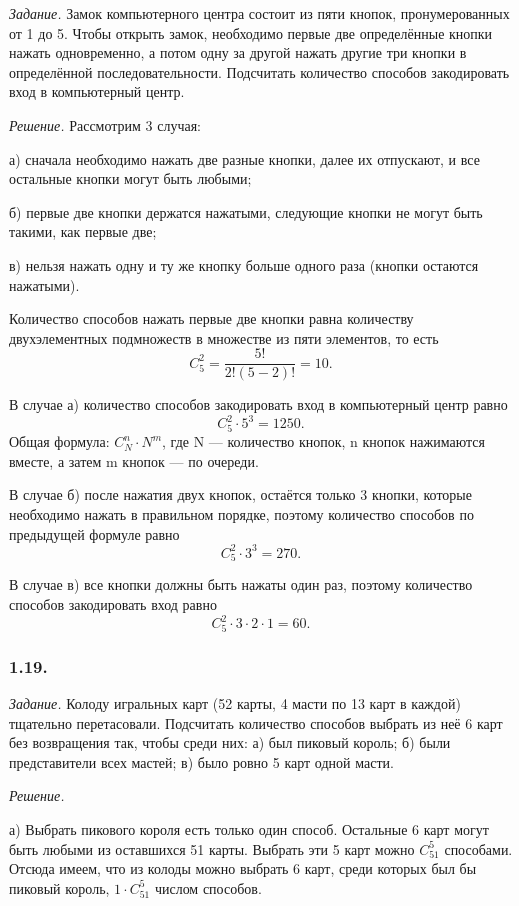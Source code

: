\documentclass{book}
\begin{document}
\textit{Задание.} Замок компьютерного центра состоит из пяти кнопок, пронумерованных от 1 до 5. Чтобы открыть замок, необходимо первые две определённые кнопки нажать одновременно, а потом одну за другой нажать другие три кнопки в определённой последовательности. Подсчитать количество способов закодировать вход в компьютерный центр.

\textit{Решение.} Рассмотрим 3 случая: 

а) сначала необходимо нажать две разные кнопки, далее их отпускают, и все остальные кнопки могут быть любыми; 

б) первые две кнопки держатся нажатыми, следующие кнопки не могут быть такими, как первые две; 

в) нельзя нажать одну и ту же кнопку больше одного раза (кнопки остаются нажатыми).

Количество способов нажать первые две кнопки равна количеству двухэлементных подмножеств в множестве из пяти элементов, то есть $$C_5^2=\frac{5!}{2!\left(5-2\right)!}=10.$$

В случае а) количество способов закодировать вход в компьютерный центр равно $$C_5^2\cdot 5^3=1250.$$ Общая формула: $C_N^n\cdot N^m$, где N --- количество кнопок, n кнопок нажимаются вместе, а затем m кнопок --- по очереди.

В случае б) после нажатия двух кнопок, остаётся только 3 кнопки, которые необходимо нажать в правильном порядке, поэтому количество способов по предыдущей формуле равно $$C_5^2\cdot 3^3=270.$$

В случае в) все кнопки должны быть нажаты один раз, поэтому количество способов закодировать вход равно $$C_5^2\cdot 3\cdot 2\cdot 1=60.$$

\subsubsection*{1.19.}

\textit{Задание.} Колоду игральных карт (52 карты, 4 масти по 13 карт в каждой) тщательно перетасовали. Подсчитать количество способов выбрать из неё 6 карт без возвращения так, чтобы среди них: а) был пиковый король; б) были представители всех мастей; в) было ровно 5 карт одной масти.

\textit{Решение.}

а) Выбрать пикового короля есть только один способ. Остальные 6 карт могут быть любыми из оставшихся 51 карты. Выбрать эти 5 карт можно $C_{51}^5$ способами. Отсюда имеем, что из колоды можно выбрать 6 карт, среди которых был бы пиковый король, $1\cdot C_{51}^5$ числом способов.
\end{document}
